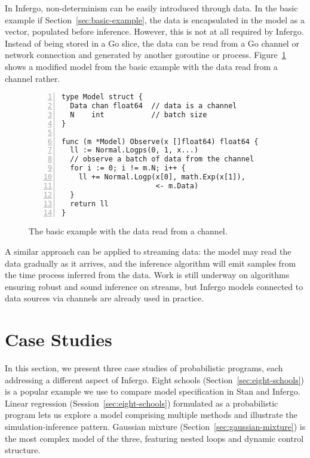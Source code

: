 \documentclass[sigplan,review,10pt,anonymous]{acmart}
\begin{document}
\begin{sloppypar}
In Infergo, non-determinism can be easily introduced through
data. In the basic example if Section~\ref{sec:basic-example},
the data is encapsulated in the model as a vector, populated
before inference. However, this is not at all required by
Infergo.  Instead of being stored in a Go slice, the data can be
read from a Go channel or network connection and generated by
another goroutine or process.
Figure~\ref{fig:basic-example-channel} shows a modified model
from the basic example with the data read from a channel rather.
\begin{figure}
  \begin{lstlisting}[framexleftmargin=10pt,numbers=left]
type Model struct {
  Data chan float64  // data is a channel
  N    int           // batch size
}

func (m *Model) Observe(x []float64) float64 {
  ll := Normal.Logps(0, 1, x...)
  // observe a batch of data from the channel
  for i := 0; i != m.N; i++ {
    ll += Normal.Logp(x[0], math.Exp(x[1]),
                      <- m.Data)
  }
  return ll
}
  \end{lstlisting}
  \caption{The basic example with the data read from a channel.}
  \label{fig:basic-example-channel}
\end{figure}

A similar approach can be applied to streaming data: the model
may read the data gradually as it arrives, and the inference
algorithm will emit samples from the time process inferred from
the data. Work is still underway on algorithms ensuring robust
and sound inference on streams, but Infergo models connected to
data sources via channels are already used in practice.

\section{Case Studies}
\label{sec:case-studies}

In this section, we present three case studies of probabilistic
programs, each addressing a different aspect of Infergo. Eight
schools (Section~\ref{sec:eight-schools}) is a popular example  we
use to compare model specification in Stan and Infergo. Linear
regression (Session~\ref{sec:eight-schools}) formulated as a
probabilistic program lets us explore a model comprising
multiple methods and illustrate the simulation-inference pattern.
Gaussian mixture (Section~\ref{sec:gaussian-mixture}) is
the most complex model of the three, featuring nested loops and
dynamic control structure.


\end{sloppypar}
\end{document}
